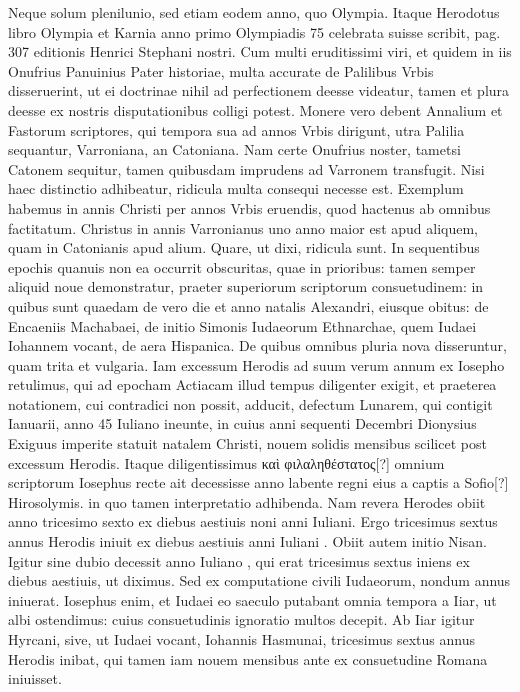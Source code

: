 Neque solum plenilunio, sed etiam eodem anno, quo
Olympia.
Itaque Herodotus libro  Olympia et Karnia anno primo
Olympiadis 75 celebrata suisse scribit, pag. 307 editionis Henrici
Stephani nostri.
Cum multi eruditissimi viri, et quidem in iis
Onufrius Panuinius Pater historiae, multa accurate de Palilibus Vrbis
disseruerint, ut ei doctrinae nihil ad perfectionem deesse videatur,
tamen et plura deesse ex nostris disputationibus colligi potest.
Monere vero debent Annalium et Fastorum scriptores, qui tempora
sua ad annos Vrbis dirigunt, utra Palilia sequantur, Varroniana,
an Catoniana.
Nam certe Onufrius noster, tametsi Catonem sequitur,
tamen quibusdam imprudens ad Varronem transfugit.
Nisi
haec distinctio adhibeatur, ridicula multa consequi necesse est.
Exemplum habemus in annis Christi per annos Vrbis eruendis,
quod hactenus ab omnibus factitatum.
Christus in annis Varronianus
uno anno maior est apud aliquem, quam in Catonianis apud alium.
Quare, ut dixi, ridicula sunt.
In sequentibus epochis quanuis
non ea occurrit obscuritas, quae in prioribus: tamen semper aliquid
noue demonstratur, praeter superiorum scriptorum consuetudinem:
in quibus sunt quaedam de vero die et anno natalis Alexandri, eiusque
obitus: de Encaeniis Machabaei, de initio Simonis Iudaeorum
Ethnarchae, quem Iudaei Iohannem vocant, de aera Hispanica.
De quibus omnibus pluria nova disseruntur, quam trita et vulgaria.
Iam
excessum Herodis ad suum verum annum ex Iosepho retulimus,
qui ad epocham Actiacam illud tempus diligenter exigit, et praeterea
notationem, cui contradici non possit, adducit, defectum Lunarem,
qui contigit  Ianuarii, anno 45 Iuliano ineunte, in cuius
anni sequenti Decembri Dionysius Exiguus imperite statuit natalem
Christi, nouem solidis mensibus scilicet post excessum Herodis.
Itaque diligentissimus \textgreek{καὶ φιλαληθέστατος[?]}
 omnium scriptorum Iosephus
recte ait decessisse  anno labente regni eius a captis a Sofio[?]
Hirosolymis. in quo tamen interpretatio adhibenda.
Nam revera Herodes
obiit anno tricesimo sexto ex diebus aestiuis noni anni Iuliani.
Ergo tricesimus sextus annus Herodis iniuit ex diebus aestiuis anni
Iuliani .
Obiit autem initio Nisan.
Igitur sine dubio decessit
anno Iuliano , qui erat tricesimus sextus iniens ex diebus aestiuis,
ut diximus.
Sed ex computatione civili Iudaeorum, nondum
 annus iniuerat.
Iosephus enim, et Iudaei eo saeculo putabant
omnia tempora a  Iiar, ut albi ostendimus: cuius consuetudinis
ignoratio multos decepit.
Ab Iiar igitur Hyrcani, sive, ut Iudaei
vocant, Iohannis Hasmunai, tricesimus sextus annus Herodis inibat,
qui tamen iam nouem mensibus ante ex consuetudine Romana iniuisset.

